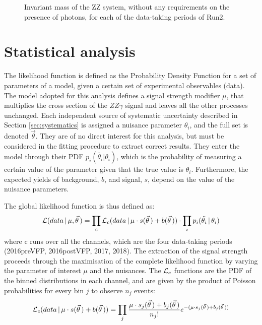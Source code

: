 \begin{figure}
%
%
%
\caption{Invariant mass of the ZZ system, without any requirements on the presence of photons, for each of the data-taking periods of Run2.}
\label{fig:ZZmass_byyear}
\end{figure}

\section{Statistical analysis}
\label{sec:statistical_analysis}
The likelihood function is defined as the Probability Density Function for a set of parameters of a model, given a certain set of experimental observables (data).
The model adopted for this analysis defines a signal strength modifier $\mu$, that multiplies the cross section of the $ZZ\gamma$ signal and leaves all the other processes unchanged.
Each independent source of systematic uncertainty described in Section \ref{sec:systematics} is assigned a nuisance parameter $\theta_i$, and the full set is denoted $\vec\theta$.
They are of no direct interest for this analysis, but must be considered in the fitting procedure to extract correct results.
They enter the model through their PDF $p_i(\tilde{\theta_i}|\theta_i)$, which is the probability of measuring a certain value of the parameter given that the true value is $\theta_i$.
Furthermore, the expected yields of background, $b$, and signal, $s$, depend on the value of the nuisance parameters.

The global likelihood function is thus defined as:
\begin{equation}
  \label{eq:likelihood_full}
  \mathcal{L}(data\, |\, \mu, \vec\theta\,) = \prod_c \mathcal{L}_c(data\, |\, \mu \cdot s(\vec\theta\,) + b(\vec\theta\,)) \cdot \prod_i p_i(\tilde{\theta_i}\, |\, \theta_i)
\end{equation}
where c runs over all the channels, which are the four data-taking periods (2016preVFP, 2016postVFP, 2017, 2018).
The extraction of the signal strength proceeds through the maximisation of the complete likelihood function by varying the parameter of interest $\mu$ and the nuisances.
The $\mathcal{L}_c$ functions are the PDF of the binned distributions in each channel, and are given by the product of Poisson probabilities for every bin $j$ to observe $n_j$ events:
\begin{equation}
  \label{eq:likelihood_bin}
  \mathcal{L}_c(data\, |\, \mu \cdot s(\vec\theta\,) + b(\vec\theta\,)) = \prod_j \frac{\mu \cdot s_j(\vec\theta\,) + b_j(\vec\theta\,)}{n_j!} e^{-(\mu \cdot s_j(\vec\theta\,) + b_j(\vec\theta\,))}
\end{equation}

